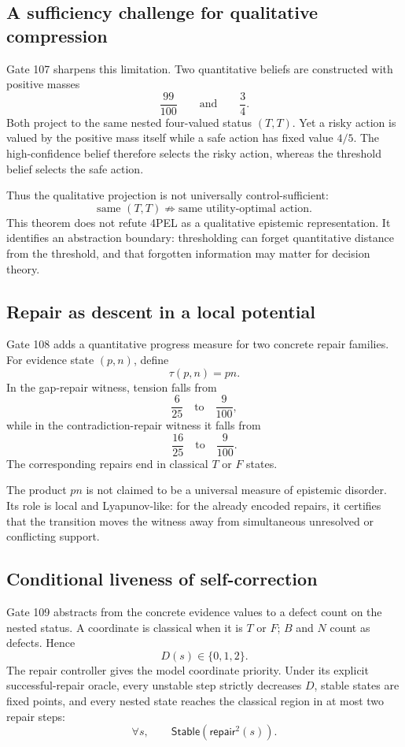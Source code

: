 \subsection{A sufficiency challenge for qualitative compression}

Gate 107 sharpens this limitation. Two quantitative beliefs are constructed with positive masses
\[
\frac{99}{100}
\qquad\text{and}\qquad
\frac34.
\]
Both project to the same nested four-valued status $(T,T)$. Yet a risky action is valued by the positive mass itself while a safe action has fixed value $4/5$. The high-confidence belief therefore selects the risky action, whereas the threshold belief selects the safe action.

Thus the qualitative projection is not universally control-sufficient:
\[
\text{same }(T,T)
\not\Rightarrow
\text{same utility-optimal action}.
\]
This theorem does not refute 4PEL as a qualitative epistemic representation. It identifies an abstraction boundary: thresholding can forget quantitative distance from the threshold, and that forgotten information may matter for decision theory.

\subsection{Repair as descent in a local potential}

Gate 108 adds a quantitative progress measure for two concrete repair families. For evidence state $(p,n)$, define
\[
\tau(p,n)=pn.
\]
In the gap-repair witness, tension falls from
\[
\frac6{25}
\quad\text{to}\quad
\frac9{100},
\]
while in the contradiction-repair witness it falls from
\[
\frac{16}{25}
\quad\text{to}\quad
\frac9{100}.
\]
The corresponding repairs end in classical $T$ or $F$ states.

The product $pn$ is not claimed to be a universal measure of epistemic disorder. Its role is local and Lyapunov-like: for the already encoded repairs, it certifies that the transition moves the witness away from simultaneous unresolved or conflicting support.

\subsection{Conditional liveness of self-correction}

Gate 109 abstracts from the concrete evidence values to a defect count on the nested status. A coordinate is classical when it is $T$ or $F$; $B$ and $N$ count as defects. Hence
\[
D(s)\in\{0,1,2\}.
\]
The repair controller gives the model coordinate priority. Under its explicit successful-repair oracle, every unstable step strictly decreases $D$, stable states are fixed points, and every nested state reaches the classical region in at most two repair steps:
\[
\forall s,\qquad
\mathsf{Stable}(\mathsf{repair}^2(s)).
\]

